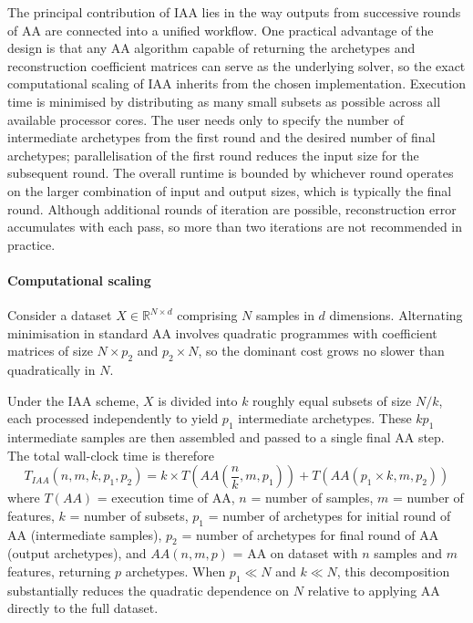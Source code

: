 \documentclass{WileyMSP-template}
\begin{document}
The principal contribution of IAA lies in the way outputs from successive rounds of AA are connected into a unified workflow. One practical advantage of the design is that any AA algorithm capable of returning the archetypes and reconstruction coefficient matrices can serve as the underlying solver, so the exact computational scaling of IAA inherits from the chosen implementation. Execution time is minimised by distributing as many small subsets as possible across all available processor cores. The user needs only to specify the number of intermediate archetypes from the first round and the desired number of final archetypes; parallelisation of the first round reduces the input size for the subsequent round. The overall runtime is bounded by whichever round operates on the larger combination of input and output sizes, which is typically the final round. Although additional rounds of iteration are possible, reconstruction error accumulates with each pass, so more than two iterations are not recommended in practice.

\paragraph{Computational scaling}
Consider a dataset $X \in \mathbb{R}^{N \times d}$ comprising $N$ samples in $d$ dimensions. Alternating minimisation in standard AA involves quadratic programmes with coefficient matrices of size $N \times p_2$ and $p_2 \times N$, so the dominant cost grows no slower than quadratically in $N$.

Under the IAA scheme, $X$ is divided into $k$ roughly equal subsets of size $N/k$, each processed independently to yield $p_1$ intermediate archetypes. These $k p_1$ intermediate samples are then assembled and passed to a single final AA step. The total wall-clock time is therefore
\begin{equation} \label{eq:IAAexeTime}
T_{IAA}(n, m, k, p_1, p_2) = k \times T\left( AA\left( \frac{n}{k}, m, p_1 \right) \right) + T\left( AA\left( p_1 \times k, m, p_2 \right) \right)
\end{equation}
where $T(AA)$ = execution time of AA, $n$ = number of samples, $m$ = number of features, $k$ = number of subsets, $p_1$ = number of archetypes for initial round of AA (intermediate samples), $p_2$ = number of archetypes for final round of AA (output archetypes), and $AA(n, m, p)$ = AA on dataset with $n$ samples and $m$ features, returning $p$ archetypes. When $p_1 \ll N$ and $k \ll N$, this decomposition substantially reduces the quadratic dependence on $N$ relative to applying AA directly to the full dataset.
\end{document}
